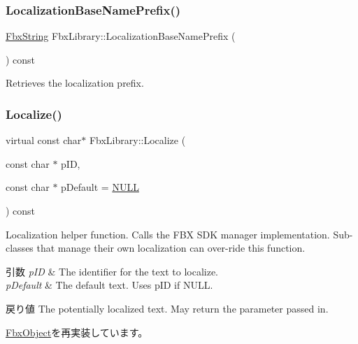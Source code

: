 \subsubsection{\texorpdfstring{Localization\+Base\+Name\+Prefix()}{LocalizationBaseNamePrefix()}\hspace{0.1cm}{\footnotesize\ttfamily [2/2]}}
{\footnotesize\ttfamily \hyperlink{class_fbx_string}{Fbx\+String} Fbx\+Library\+::\+Localization\+Base\+Name\+Prefix (\begin{DoxyParamCaption}{ }\end{DoxyParamCaption}) const}



Retrieves the localization prefix. 

\mbox{\label{class_fbx_library_a6f71bf208f95cc8033123e173e64b298}} 
\subsubsection{\texorpdfstring{Localize()}{Localize()}}
{\footnotesize\ttfamily virtual const char$\ast$ Fbx\+Library\+::\+Localize (\begin{DoxyParamCaption}\item[{const char $\ast$}]{p\+ID,  }\item[{const char $\ast$}]{p\+Default = {\ttfamily \hyperlink{fbxarch_8h_a070d2ce7b6bb7e5c05602aa8c308d0c4}{N\+U\+LL}} }\end{DoxyParamCaption}) const\hspace{0.3cm}{\ttfamily [virtual]}}

Localization helper function. Calls the F\+BX S\+DK manager implementation. Sub-\/classes that manage their own localization can over-\/ride this function. 
\begin{DoxyParams}{引数}
{\em p\+ID} & The identifier for the text to localize. \\
\hline
{\em p\+Default} & The default text. Uses p\+ID if N\+U\+LL. \\
\hline
\end{DoxyParams}
\begin{DoxyReturn}{戻り値}
The potentially localized text. May return the parameter passed in. 
\end{DoxyReturn}


\hyperlink{class_fbx_object_a9b8ae43ccdd09be07b450e0ed54788ab}{Fbx\+Object}を再実装しています。

